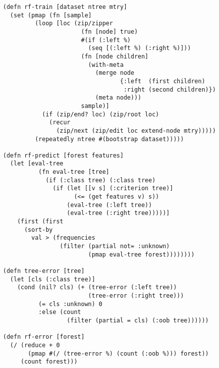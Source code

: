 \documentclass[a4paper,man,12pt,apacite,floatsintext,draftfirst]{apa6} %
\begin{document}
\begin{verbatim}
(defn rf-train [dataset ntree mtry]
  (set (pmap (fn [sample]
         (loop [loc (zip/zipper
                      (fn [node] true)
                      #(if (:left %)
                        (seq [(:left %) (:right %)]))
                      (fn [node children]
                        (with-meta
                          (merge node
                                 {:left  (first children)
                                  :right (second children)})
                          (meta node)))
                      sample)]
           (if (zip/end? loc) (zip/root loc)
             (recur
               (zip/next (zip/edit loc extend-node mtry)))))
         (repeatedly ntree #(bootstrap dataset)))))

(defn rf-predict [forest features]
  (let [eval-tree
          (fn eval-tree [tree]
            (if (:class tree) (:class tree)
              (if (let [[v s] (:criterion tree)]
                    (<= (get features v) s))
                  (eval-tree (:left tree))
                  (eval-tree (:right tree)))))]
    (first (first
      (sort-by
        val > (frequencies
                (filter (partial not= :unknown)
                        (pmap eval-tree forest))))))))

(defn tree-error [tree]
  (let [cls (:class tree)]
    (cond (nil? cls) (+ (tree-error (:left tree))
                        (tree-error (:right tree)))
          (= cls :unknown) 0
          :else (count
                  (filter (partial = cls) (:oob tree))))))

(defn rf-error [forest]
  (/ (reduce + 0
       (pmap #(/ (tree-error %) (count (:oob %))) forest))
     (count forest)))
\end{verbatim}


\end{document}
